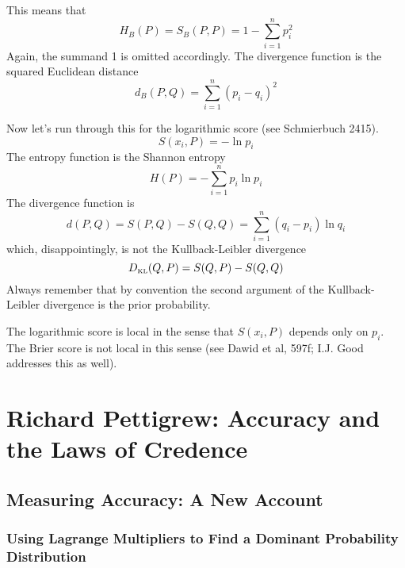 \documentclass[12pt]{article}
\begin{document}
This means that
\begin{equation}
  \label{eq:aechahso}
  H_{B}(P)=S_{B}(P,P)=1-\sum_{i=1}^{n}p_{i}^{2}
\end{equation}
Again, the summand 1 is omitted accordingly. The divergence function
is the squared Euclidean distance
\begin{equation}
  \label{eq:goweepip}
  d_{B}(P,Q)=\sum_{i=1}^{n}(p_{i}-q_{i})^{2}
\end{equation}

Now let's run through this for the logarithmic score (see Schmierbuch 2415).
\begin{equation}
  \label{eq:ohngooth}
  S(x_{i},P)=-\ln{}p_{i}
\end{equation}
The entropy function is the Shannon entropy
\begin{equation}
  \label{eq:ahsainie}
  H(P)=-\sum_{i=1}^{n}p_{i}\ln{}p_{i}
\end{equation}
The divergence function is 
\begin{equation}
  \label{eq:ohbaibah}
  d(P,Q)=S(P,Q)-S(Q,Q)=\sum_{i=1}^{n}(q_{i}-p_{i})\ln{}q_{i}
\end{equation}
which, disappointingly, is not the Kullback-Leibler divergence
\begin{equation}
  \label{eq:oopeesae}
  D_{\mbox{\tiny KL}}(Q,P)=S(Q,P)-S(Q,Q)
\end{equation}
Always remember that by convention the second argument of the
Kullback-Leibler divergence is the prior probability. 

The logarithmic score is local in the sense that $S(x_{i},P)$ depends
only on $p_{i}$. The Brier score is not local in this sense (see Dawid
et al, 597f; I.J. Good addresses this as well). 

\section{Richard Pettigrew: Accuracy and the Laws of Credence}
\label{section:pettigrew}

\subsection{Measuring Accuracy: A New Account}
\label{subsection:xiphievi}

\subsubsection{Using Lagrange Multipliers to Find a Dominant
  Probability Distribution}
\label{subsubsection:hiewohph}
\end{document}
